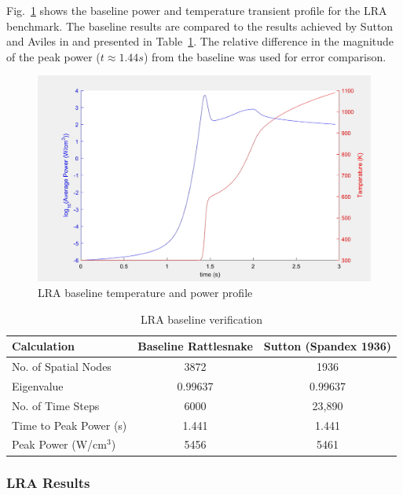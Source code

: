 \documentclass{elsarticle}
\newcommand{\fig}[1]{Fig.~\ref{#1}}                      %
\newcommand{\tbl}[1]{Table~\ref{#1}}                     %
\begin{document}
\fig{fig:lra_profile} shows the baseline power and temperature transient profile for the LRA benchmark. The baseline results are compared to the results achieved by Sutton and Aviles in \cite{Sutton_1996} and presented in \tbl{tab:base}.  The relative difference in the magnitude of the peak power ($t\approx1.44 s$) from the baseline was used for error comparison.  

\begin{figure}[htbp!]
\centering
\includegraphics[width=\linewidth]{figures/lra_profile.png}
\caption{LRA baseline temperature and power profile}
\label{fig:lra_profile}
\end{figure}

\begin{table}[!htbp]
\begin{center}
\caption{LRA baseline verification}
\label{tab:base}
\begin{tabular}{|l||c|c|}
\hline
Calculation   &  Baseline Rattlesnake & Sutton (Spandex 1936) \\
\hline\hline
No. of Spatial Nodes	& 3872 		& 1936 \\
Eigenvalue 				& 0.99637	& 0.99637 \\
No. of Time Steps 		& 6000 		& 23,890 \\
Time to Peak Power (s) 	& 1.441 	& 1.441 \\
Peak Power (W/cm$^3$) 	& 5456 		& 5461 \\
\hline
\end{tabular}
\end{center}
\end{table}

\subsubsection{LRA Results}
\end{document}
